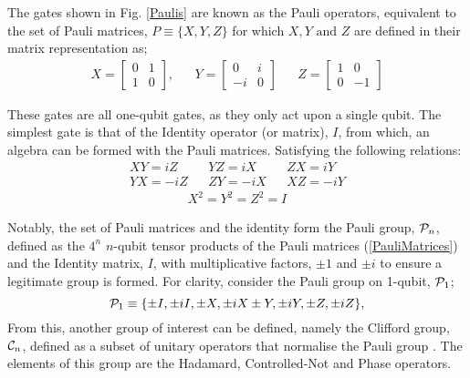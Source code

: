 The gates shown in Fig. \ref{Paulis} are known as the Pauli operators, equivalent
to the set of Pauli matrices, $P \equiv \{X, Y, Z\}$ for which $X, Y \text{ and } Z$ are defined in their matrix representation as;
\begin{align}
    \label{PauliMatrices}
    X = \begin{bmatrix}
            0 & 1 \\
            1 & 0
        \end{bmatrix},
     &  &
    Y = \begin{bmatrix}
            0  & i \\
            -i & 0
        \end{bmatrix}
     &  &
    Z = \begin{bmatrix}
            1 & 0  \\
            0 & -1
        \end{bmatrix}
\end{align}

These gates are all one-qubit gates, as they only act upon a single qubit.
The simplest gate is that of the Identity operator (or matrix), $I$, from which, an algebra
can be formed with the Pauli matrices. Satisfying the following relations:
\begin{align}
    XY = iZ  &  & YZ = iX  &  & ZX = iY  \\
    YX = -iZ &  & ZY = -iX &  & XZ = -iY
\end{align}
\begin{align}
    X^2 = Y^2 = Z^2 = I
\end{align}

Notably, the set of Pauli matrices and the identity form
the Pauli group, ${\cal P}_n$, defined as the $4^n$ $n$-qubit tensor products of the Pauli matrices (\ref{PauliMatrices}) and the
Identity matrix, $I$, with multiplicative factors, $\pm 1$ and $\pm i$ to ensure a legitimate group is formed.
For clarity, consider the Pauli group on 1-qubit, ${\cal P}_1$;
\begin{equation}
    {\cal P}_1 \equiv \{ \pm I, \pm iI, \pm X, \pm iX \pm Y, \pm iY, \pm Z, \pm iZ\},
\end{equation}
From this, another group of interest can be defined, namely the Clifford group, ${\cal C}_n$, defined as a
subset of unitary operators that normalise the Pauli group \cite{orthogonalcodes}. The elements of this group are the
Hadamard, Controlled-Not and Phase operators.

